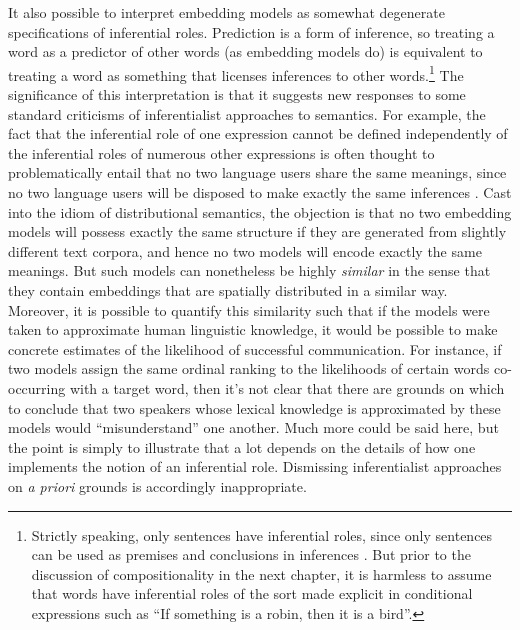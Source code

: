 It also possible to interpret embedding models as somewhat degenerate specifications of inferential roles. Prediction is a form of inference, so treating a word as a predictor of other words (as embedding models do) is equivalent to treating a word as something that licenses inferences to other words.\footnote{Strictly speaking, only sentences have inferential roles, since only sentences can be used as premises and conclusions in inferences \citep{Brandom:1994}. But prior to the discussion of compositionality in the next chapter, it is harmless to assume that words have inferential roles of the sort made explicit in conditional expressions such as ``If something is a robin, then it is a bird''.} The significance of this interpretation is that it suggests new responses to some standard criticisms of inferentialist approaches to semantics. For example, the fact that the inferential role of one expression cannot be defined independently of the inferential roles of numerous other expressions is often thought to problematically entail that no two language users share the same meanings, since no two language users will be disposed to make exactly the same inferences \citep{FodorLepore:1991,FodorLepore:2002}. Cast into the idiom of distributional semantics, the objection is that no two embedding models will possess exactly the same structure if they are generated from slightly different text corpora, and hence no two models will encode exactly the same meanings. But such models can nonetheless be highly \textit{similar} in the sense that they contain embeddings that are spatially distributed in a similar way. Moreover, it is possible to quantify this similarity such that if the models were taken to approximate human linguistic knowledge, it would be possible to make concrete estimates of the likelihood of successful communication. For instance, if two models assign the same ordinal ranking to the likelihoods of certain words co-occurring with a target word, then it's not clear that there are grounds on which to conclude that two speakers whose lexical knowledge is approximated by these models would ``misunderstand'' one another. Much more could be said here, but the point is simply to illustrate that a lot depends on the details of how one implements the notion of an inferential role. Dismissing inferentialist approaches on \textit{a priori} grounds is accordingly inappropriate.

